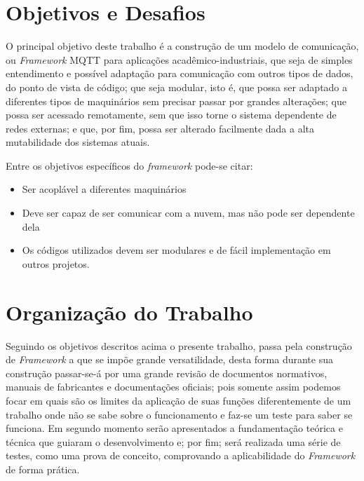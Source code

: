 \section{Objetivos e Desafios}
O principal objetivo deste trabalho é a construção de um modelo de comunicação, ou \textit{Framework} \ac{MQTT} para aplicações
acadêmico-industriais, que seja de simples
entendimento e possível adaptação para comunicação com outros tipos de dados, do ponto de vista de código; que seja 
modular, isto é, que possa ser adaptado a diferentes tipos de maquinários sem precisar passar por grandes alterações;
que possa ser acessado remotamente, sem que isso torne o sistema dependente de redes externas; e que, por fim, possa ser 
alterado facilmente dada a alta mutabilidade dos sistemas atuais.

Entre os objetivos específicos do \textit{framework} pode-se citar:

\begin{itemize}
    \item Ser acoplável a diferentes maquinários
    \item Deve ser capaz de ser comunicar com a nuvem, mas não pode ser dependente dela
    \item Os códigos utilizados devem ser modulares e de fácil implementação em outros projetos.
\end{itemize}

\section{Organização do Trabalho}
Seguindo os objetivos descritos acima o presente trabalho, passa pela construção de \textit{Framework} a que se impõe grande versatilidade,
desta forma durante sua construção passar-se-á por uma grande revisão de documentos normativos, manuais de fabricantes e 
documentações oficiais; pois somente assim podemos focar em quais são os limites da aplicação de suas funções diferentemente
de um trabalho onde não se sabe sobre o funcionamento e faz-se um teste para saber se funciona. Em segundo momento serão 
apresentados a fundamentação teórica e técnica que guiaram o desenvolvimento e; por fim; será realizada uma série de testes,
como uma prova de conceito, comprovando a aplicabilidade do \textit{Framework} de forma prática.

